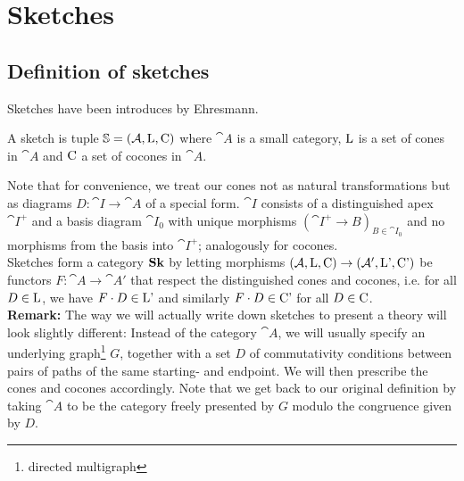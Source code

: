 \section{Sketches}
\label{sec:sketches}

\subsection{Definition of sketches}

Sketches have been introduces by Ehresmann. %

\begin{Definition}[Sketch]
A sketch is tuple $\mathbb S = (\mathcal{A}, \textrm{L}, \textrm{C})$ where $\cat A$ is a small category, $\textrm{L}$ is a set of cones in $\cat A$ and $\textrm{C}$ a set of cocones in $\cat A$.
\end{Definition}
Note that for convenience, we treat our cones not as natural transformations but as diagrams $D : \cat I \to \cat A$ of a special form. $\cat I$ consists of a distinguished apex $\cat I^+$ and a basis diagram $\cat I_0$ with unique morphisms $(\cat I^+ \to B)_{B \in \cat I_0}$ and no morphisms from the basis into $\cat I^+$; analogously for cocones. \\

Sketches form a category $\mathbf{Sk}$ by letting morphisms $(\mathcal{A}, \textrm{L}, \textrm{C}) \to (\mathcal{A}', \textrm{L'}, \textrm{C'})$ be functors $F : \cat A \to \cat A'$ that respect the distinguished cones and cocones, i.e. for all $D \in \textrm{L}$, we have $F \cdot D \in \textrm{L'}$ and similarly $F \cdot D \in \textrm{C'}$ for all $D \in \textrm{C}$. \\

\textbf{Remark: } The way we will actually write down sketches to present a theory will look slightly different: Instead of the category $\cat A$, we will usually specify an underlying graph\footnote{directed multigraph} $G$, together with a set $D$ of commutativity conditions between pairs of paths of the same starting- and endpoint. We will then prescribe the cones and cocones accordingly. Note that we get back to our original definition by taking $\cat A$ to be the category freely presented by $G$ modulo the congruence given by $D$. 

